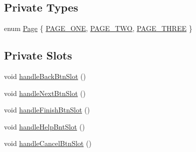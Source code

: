 \subsection*{Private Types}
\begin{DoxyCompactItemize}
\item 
enum \hyperlink{class_run_gui_acb4a3da6e31619ee4b0ac8c8f9cb64a3}{Page} \{ \hyperlink{class_run_gui_acb4a3da6e31619ee4b0ac8c8f9cb64a3aad59b834aebc523b21fc270d5d5fa41e}{P\-A\-G\-E\-\_\-\-O\-N\-E}, 
\hyperlink{class_run_gui_acb4a3da6e31619ee4b0ac8c8f9cb64a3a141aac6dec6d5f36540fcaf2fe34f343}{P\-A\-G\-E\-\_\-\-T\-W\-O}, 
\hyperlink{class_run_gui_acb4a3da6e31619ee4b0ac8c8f9cb64a3a58cde07651bfba4a62997dc50a95fba1}{P\-A\-G\-E\-\_\-\-T\-H\-R\-E\-E}
 \}
\end{DoxyCompactItemize}
\subsection*{Private Slots}
\begin{DoxyCompactItemize}
\item 
void \hyperlink{class_run_gui_abe8773e053b15ed96efcdb6e4b63e508}{handle\-Back\-Btn\-Slot} ()
\item 
void \hyperlink{class_run_gui_a267f472d21d57258adb28ebdcc83b256}{handle\-Next\-Btn\-Slot} ()
\item 
void \hyperlink{class_run_gui_a011495c9158d92b794941ac108b5b148}{handle\-Finish\-Btn\-Slot} ()
\item 
void \hyperlink{class_run_gui_ab29bf8394f8b23b2c1ffd33c6d2470eb}{handle\-Help\-Bnt\-Slot} ()
\item 
void \hyperlink{class_run_gui_a1127986fbf076ce480defe68d99171e1}{handle\-Cancel\-Btn\-Slot} ()
\end{DoxyCompactItemize}
